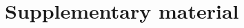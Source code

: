 \section{Supplementary material}

\renewcommand{\thefigure}{S\arabic{figure}}
\setcounter{figure}{0}
\renewcommand{\thetable}{S\arabic{table}}
\setcounter{table}{0}

